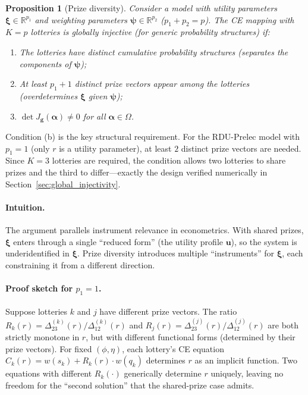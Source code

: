 \documentclass[11pt,a4paper]{article}
\newtheorem{proposition}[theorem]{Proposition}
\theoremstyle{definition}
\begin{document}
\begin{proposition}[Prize diversity]
\label{prop:prize_diversity}
Consider a model with utility parameters $\bm{\xi} \in \mathbb{R}^{p_1}$ and
weighting parameters $\bm{\psi} \in \mathbb{R}^{p_2}$ ($p_1 + p_2 = p$). The
CE mapping with $K = p$ lotteries is globally injective (for generic
probability structures) if:
\begin{enumerate}
    \item[\textnormal{(a)}] The lotteries have distinct cumulative probability
    structures (separates the components of $\bm{\psi}$);
    \item[\textnormal{(b)}] At least $p_1 + 1$ distinct prize vectors appear
    among the lotteries (overdetermines $\bm{\xi}$ given $\bm{\psi}$);
    \item[\textnormal{(c)}] $\det J_{\mathbf{g}}(\bm{\alpha}) \neq 0$ for all
    $\bm{\alpha} \in \Omega$.
\end{enumerate}
\end{proposition}

Condition (b) is the key structural requirement. For the RDU-Prelec model with
$p_1 = 1$ (only $r$ is a utility parameter), at least $2$ distinct prize
vectors are needed. Since $K = 3$ lotteries are required, the condition allows
two lotteries to share prizes and the third to differ---exactly the design
verified numerically in Section~\ref{sec:global_injectivity}.

\paragraph{Intuition.} The argument parallels instrument relevance in
econometrics. With shared prizes, $\bm{\xi}$ enters through a single ``reduced
form'' (the utility profile $\mathbf{u}$), so the system is underidentified in
$\bm{\xi}$. Prize diversity introduces multiple ``instruments'' for
$\bm{\xi}$, each constraining it from a different direction.

\paragraph{Proof sketch for $p_1 = 1$.} Suppose lotteries $k$ and $j$ have
different prize vectors. The ratio
$R_k(r) = \Delta_{23}^{(k)}(r) / \Delta_{12}^{(k)}(r)$ and
$R_j(r) = \Delta_{23}^{(j)}(r) / \Delta_{12}^{(j)}(r)$ are both strictly
monotone in $r$, but with different functional forms (determined by their prize
vectors). For fixed $(\phi, \eta)$, each lottery's CE equation
$C_k(r) = w(s_k) + R_k(r) \cdot w(q_k)$ determines $r$ as an implicit
function. Two equations with different $R_k(\cdot)$ generically determine $r$
uniquely, leaving no freedom for the ``second solution'' that the shared-prize
case admits.
\end{document}
